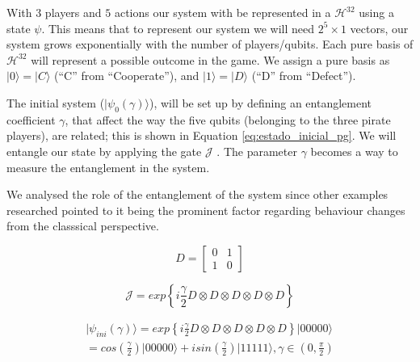\documentclass[10pt,twocolumn]{llncs}
\begin{document}
With $3$ players and $5$ actions our system with be represented in a $\mathcal{H}^{32}$ using a state $\psi$. This means that to represent our system we will need $2^{5}\times 1$ vectors, our system grows exponentially with the number of players/qubits. Each pure basis  of $\mathcal{H}^{32}$ will represent a possible outcome in the game. We assign a pure basis as $\vert 0\rangle = \vert C\rangle$ (``C'' from ``Cooperate''), and $\vert 1\rangle = \vert D\rangle$ (``D'' from ``Defect''). 




The initial system ($\vert \psi_{0}(\gamma) \rangle$), will be set up by defining an entanglement coefficient $\gamma$, that affect the way the five qubits (belonging to the three pirate players), are related; this is shown in Equation \ref{eq:estado_inicial_pg}. 
We will entangle our state by applying the gate $\mathcal{J}$ \cite{Letters2002}. The parameter $\gamma$ becomes a way to measure the entanglement in the system\cite{Eisert2008}. 

We analysed the role of the entanglement of the system since other examples researched pointed to it being the prominent factor regarding behaviour changes from the classsical perspective\cite{Fra2011a}\cite{Fra2011}\cite{Letters2002}\cite{Khan2011}\cite{Ricketts2006}. 


\begin{equation}
D=\left[\begin{array}{cc}
0 & 1\\
1 & 0
\end{array}\right]
\label{eq:DDDDDDDrica}
\end{equation} 



\begin{equation}
\mathcal{J}=exp\left\{ i\frac{\gamma}{2} D \otimes D \otimes D \otimes D 
\otimes D
\right\} 
\label{eq:matrix_exponencial_esoterica}
\end{equation} 

\begin{center}
\begin{equation}
\begin{split}
\vert\psi_{ini}(\gamma)\rangle=exp\left\{ i\frac{\gamma}{2} D \otimes D \otimes D \otimes D 
\otimes D\right\} \vert00000\rangle \\
=cos(\frac{\gamma}{2})\vert00000\rangle+isin(\frac{\gamma}{2})\vert11111\rangle,\gamma\in(0,\frac{\pi}{2})
 \end{split}
\label{eq:estado_inicial_pg}
\end{equation}
\end{center}
\end{document}
